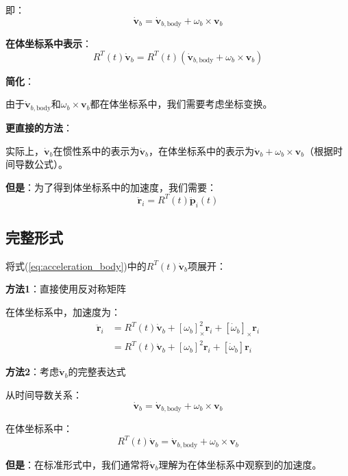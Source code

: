 \documentclass[12pt,a4paper]{article}
\begin{document}
即：
\begin{equation}
\dot{\bm{v}}_b = \dot{\bm{v}}_{b,\text{body}} + \omega_b \times \bm{v}_b
\end{equation}

\textbf{在体坐标系中表示}：
\begin{equation}
R^T(t) \dot{\bm{v}}_b = R^T(t) (\dot{\bm{v}}_{b,\text{body}} + \omega_b \times \bm{v}_b)
\end{equation}

\textbf{简化}：

由于$\dot{\bm{v}}_{b,\text{body}}$和$\omega_b \times \bm{v}_b$都在体坐标系中，我们需要考虑坐标变换。

\textbf{更直接的方法}：

实际上，$\dot{\bm{v}}_b$在惯性系中的表示为$\dot{\bm{v}}_b$，在体坐标系中的表示为$\dot{\bm{v}}_b + \omega_b \times \bm{v}_b$（根据时间导数公式）。

\textbf{但是}：为了得到体坐标系中的加速度，我们需要：
\begin{equation}
\ddot{\bm{r}}_i = R^T(t) \ddot{\bm{p}}_i(t)
\end{equation}

\subsection{完整形式}

将式(\ref{eq:acceleration_body})中的$R^T(t) \dot{\bm{v}}_b$项展开：

\textbf{方法1}：直接使用反对称矩阵

在体坐标系中，加速度为：
\begin{align}
\ddot{\bm{r}}_i &= R^T(t) \dot{\bm{v}}_b + [\omega_b]_{\times}^2 \bm{r}_i + [\dot{\omega}_b]_{\times} \bm{r}_i \\
&= R^T(t) \dot{\bm{v}}_b + [\omega_b]^2 \bm{r}_i + [\dot{\omega}_b] \bm{r}_i
\end{align}

\textbf{方法2}：考虑$\dot{\bm{v}}_b$的完整表达式

从时间导数关系：
\begin{equation}
\dot{\bm{v}}_b = \dot{\bm{v}}_{b,\text{body}} + \omega_b \times \bm{v}_b
\end{equation}

在体坐标系中：
\begin{equation}
R^T(t) \dot{\bm{v}}_b = \dot{\bm{v}}_{b,\text{body}} + \omega_b \times \bm{v}_b
\end{equation}

\textbf{但是}：在标准形式中，我们通常将$\dot{\bm{v}}_b$理解为在体坐标系中观察到的加速度。
\end{document}
